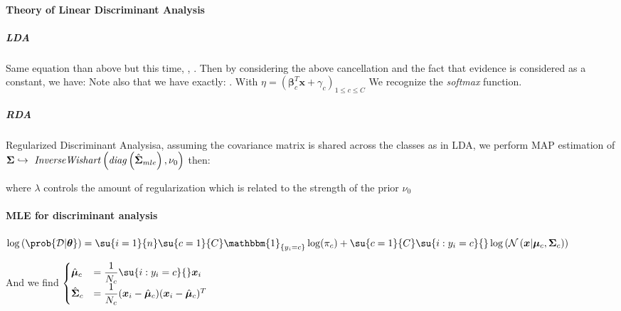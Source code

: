 \paragraph{Theory of Linear Discriminant Analysis}
\subparagraph{LDA}
Same equation than above but this time, , .
Then by considering the above cancellation and the fact that 
evidence is considered as a constant, we have:
Note also that we have exactly: . With $\eta=\left(
\bm{\beta}^{T}_{c}\bm{x} +\gamma_{c}\right)_{1\leq c\leq C}$
We recognize the \emph{softmax} function.
\subparagraph{RDA}
Regularized Discriminant Analysisa, assuming the covariance matrix is shared across the classes as in
LDA, we perform MAP estimation of $\bm{\Sigma}\hookrightarrow\text{ \emph{InverseWishart}}\left(
\text{\emph{diag}}\left(\hat{\bm{\Sigma}}_{mle}\right), \nu_{0}\right)$ then:
\begin{center}
\end{center}
where $\lambda$ controls the amount of regularization which is related to the strength of the prior
$\nu_{0}$

\paragraph{MLE for discriminant analysis}
\begin{center}
    $\log\left(\prob{\mathcal{D}|\bm{\theta}}\right) = \su{i=1}{n}\su{c=1}{C}\mathbbm{1}_{\{y_{i}=c
    \}}\log(\pi_{c}) + \su{c=1}{C}\su{i:y_{i}=c}{}\log\left(\mathcal{N}\left(\bm{x}|\bm{\mu}_{c},
    \bm{\Sigma}_{c}\right)\right)$
\end{center}
And we find 
$\begin{cases}
    \hat{\bm{\mu}}_{c} &= \dfrac{1}{N_{c}}\su{i:y_{i}=c}{}\bm{x}_{i} \\
    \hat{\bm{\Sigma}}_{c} &= \dfrac{1}{N_{c}}(\bm{x}_{i}-\hat{\bm{\mu}}_{c})(\bm{x}_{i}-
    \hat{\bm{\mu}}_{c})^{T}
\end{cases}$

